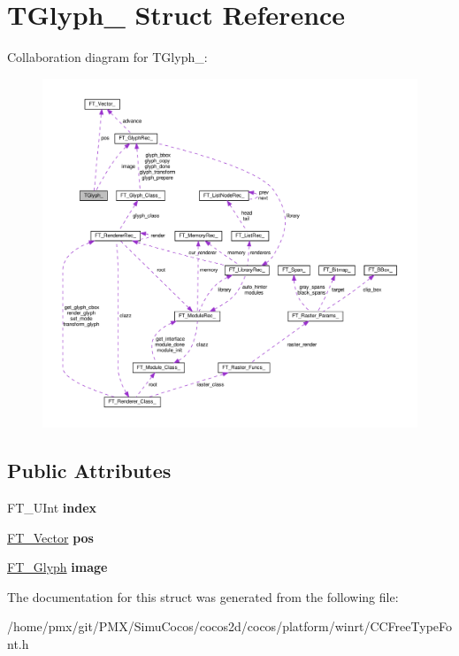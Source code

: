 \hypertarget{structTGlyph__}{}\section{T\+Glyph\+\_\+ Struct Reference}
\label{structTGlyph__}


Collaboration diagram for T\+Glyph\+\_\+\+:
\nopagebreak
\begin{figure}[H]
\begin{center}
\leavevmode
\includegraphics[width=350pt]{structTGlyph____coll__graph}
\end{center}
\end{figure}
\subsection*{Public Attributes}
\begin{DoxyCompactItemize}
\item 
\mbox{\label{structTGlyph___ae23126cc194973cee38a71a47b4f3cbb}} 
F\+T\+\_\+\+U\+Int {\bfseries index}
\item 
\mbox{\label{structTGlyph___ad69add410ef8615b0263e3fd103a75e1}} 
\hyperlink{structFT__Vector__}{F\+T\+\_\+\+Vector} {\bfseries pos}
\item 
\mbox{\label{structTGlyph___a2b015e7cd916ed1c04ec60d2f0d82f12}} 
\hyperlink{structFT__GlyphRec__}{F\+T\+\_\+\+Glyph} {\bfseries image}
\end{DoxyCompactItemize}


The documentation for this struct was generated from the following file\+:\begin{DoxyCompactItemize}
\item 
/home/pmx/git/\+P\+M\+X/\+Simu\+Cocos/cocos2d/cocos/platform/winrt/C\+C\+Free\+Type\+Font.\+h\end{DoxyCompactItemize}
